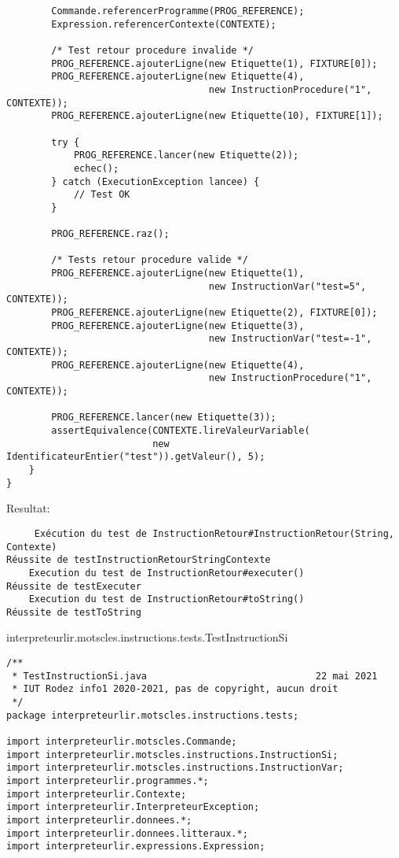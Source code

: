 \begin{enum}
\begin{verbatim}
        Commande.referencerProgramme(PROG_REFERENCE);
        Expression.referencerContexte(CONTEXTE);
        
        /* Test retour procedure invalide */
        PROG_REFERENCE.ajouterLigne(new Etiquette(1), FIXTURE[0]);
        PROG_REFERENCE.ajouterLigne(new Etiquette(4),
                                    new InstructionProcedure("1", CONTEXTE));
        PROG_REFERENCE.ajouterLigne(new Etiquette(10), FIXTURE[1]);
        
        try {
            PROG_REFERENCE.lancer(new Etiquette(2));
            echec();
        } catch (ExecutionException lancee) {
            // Test OK
        }
        
        PROG_REFERENCE.raz();
        
        /* Tests retour procedure valide */
        PROG_REFERENCE.ajouterLigne(new Etiquette(1),
                                    new InstructionVar("test=5", CONTEXTE));
        PROG_REFERENCE.ajouterLigne(new Etiquette(2), FIXTURE[0]);
        PROG_REFERENCE.ajouterLigne(new Etiquette(3),
                                    new InstructionVar("test=-1", CONTEXTE));
        PROG_REFERENCE.ajouterLigne(new Etiquette(4),
                                    new InstructionProcedure("1", CONTEXTE));
        
        PROG_REFERENCE.lancer(new Etiquette(3));
        assertEquivalence(CONTEXTE.lireValeurVariable(
                          new IdentificateurEntier("test")).getValeur(), 5);
    }
}
\end{verbatim}
Resultat:
\begin{verbatim}
     Exécution du test de InstructionRetour#InstructionRetour(String, Contexte)
Réussite de testInstructionRetourStringContexte
    Execution du test de InstructionRetour#executer()
Réussite de testExecuter
    Execution du test de InstructionRetour#toString()
Réussite de testToString
\end{verbatim}

    \item interpreteurlir.motscles.instructions.tests.TestInstructionSi
\begin{verbatim}
/**
 * TestInstructionSi.java                              22 mai 2021
 * IUT Rodez info1 2020-2021, pas de copyright, aucun droit
 */
package interpreteurlir.motscles.instructions.tests;

import interpreteurlir.motscles.Commande;
import interpreteurlir.motscles.instructions.InstructionSi;
import interpreteurlir.motscles.instructions.InstructionVar;
import interpreteurlir.programmes.*;
import interpreteurlir.Contexte;
import interpreteurlir.InterpreteurException;
import interpreteurlir.donnees.*;
import interpreteurlir.donnees.litteraux.*;
import interpreteurlir.expressions.Expression;


\end{verbatim}
\end{enum}
